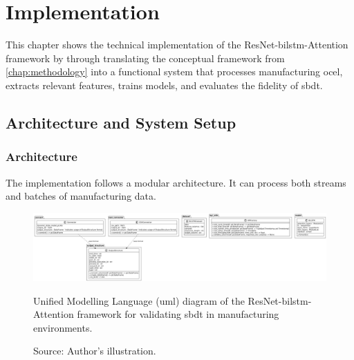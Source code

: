 \chapter{Implementation}
\label{chap:implementation}
This chapter shows the technical implementation of the ResNet-\gls{bilstm}-Attention framework by \textcite{Fischer2025ResNetBiLSTM} through translating the conceptual framework from \autoref{chap:methodology} into a functional system that processes manufacturing \gls{ocel}, extracts relevant features, trains models, and evaluates the fidelity of \gls{sbdt}.

\section{Architecture and System Setup}

\subsection{Architecture}
The implementation follows a modular architecture. It can process both streams and batches of manufacturing data.

\begin{figure}[htbp]
  \centering
  \includegraphics[width=1\textwidth]{figures/code.png}
  \caption[UML Diagram of the Implementation]{Unified Modelling Language (\gls{uml}) diagram of the ResNet-\gls{bilstm}-Attention framework for validating \gls{sbdt} in manufacturing environments.}
  \caption*{Source: Author's illustration.}
  \label{fig:uml-diagram}
\end{figure}

